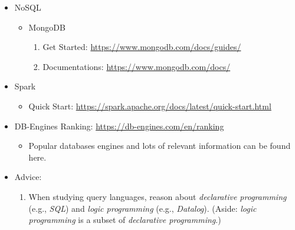 \documentclass{article}
\begin{document}
\begin{enumerate}
\begin{itemize}
        \item NoSQL
        \begin{itemize}
            \item MongoDB
            \begin{enumerate}
                \item Get Started:
                \href{https://www.mongodb.com/docs/guides/}{https://www.mongodb.com/docs/guides/}
                \item Documentations:
                \href{https://www.mongodb.com/docs/}{https://www.mongodb.com/docs/}
            \end{enumerate}
        \end{itemize}
        \item Spark
        \begin{itemize}
            \item Quick Start:
            \href{https://spark.apache.org/docs/latest/quick-start.html}{https://spark.apache.org/docs/latest/quick-start.html}
        \end{itemize}
        \item DB-Engines Ranking:
            \href{https://db-engines.com/en/ranking}{https://db-engines.com/en/ranking}
            \begin{itemize}
                \item Popular databases engines and lots of relevant information can be found here.
            \end{itemize}        
        \item Advice:
        \begin{enumerate}
            \item When studying query languages, reason about \emph{declarative programming} (e.g., \emph{SQL}) and \emph{logic programming} (e.g., \emph{Datalog}).
            (Aside: \emph{logic programming} is a subset of \emph{declarative programming}.)
        \end{enumerate}
    \end{itemize}


\end{enumerate}
\end{document}
